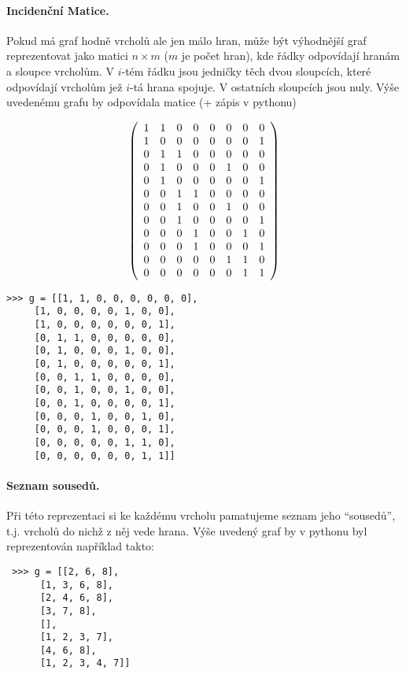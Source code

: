 \paragraph{Incidenční Matice.} Pokud má graf hodně vrcholů ale jen málo hran, může být výhodnější graf reprezentovat jako matici $n\times m$ ($m$ je počet hran), kde řádky
odpovídají hranám a sloupce vrcholům. V $i$-tém řádku jsou jedničky těch dvou sloupcích, které odpovídají vrcholům jež $i$-tá hrana spojuje. V ostatních sloupcích jsou nuly.
Výše uvedenému grafu by odpovídala matice (+ zápis v pythonu)
\begin{center}
\begin{minipage}{3.5cm}
$$
\left(
\begin{array}{cccccccc}
1 & 1 & 0 & 0 & 0 & 0 & 0 & 0\cr
1 & 0 & 0 & 0 & 0 & 0 & 0 & 1\cr
0 & 1 & 1 & 0 & 0 & 0 & 0 & 0\cr
0 & 1 & 0 & 0 & 0 & 1 & 0 & 0\cr
0 & 1 & 0 & 0 & 0 & 0 & 0 & 1\cr
0 & 0 & 1 & 1 & 0 & 0 & 0 & 0\cr
0 & 0 & 1 & 0 & 0 & 1 & 0 & 0\cr
0 & 0 & 1 & 0 & 0 & 0 & 0 & 1\cr
0 & 0 & 0 & 1 & 0 & 0 & 1 & 0\cr
0 & 0 & 0 & 1 & 0 & 0 & 0 & 1\cr
0 & 0 & 0 & 0 & 0 & 1 & 1 & 0\cr
0 & 0 & 0 & 0 & 0 & 0 & 1 & 1\cr
\end{array}
\right)
$$
\end{minipage}
\hskip2cm
\begin{minipage}{6cm}
\begin{verbatim}
>>> g = [[1, 1, 0, 0, 0, 0, 0, 0],
	 [1, 0, 0, 0, 0, 1, 0, 0],
	 [1, 0, 0, 0, 0, 0, 0, 1],
	 [0, 1, 1, 0, 0, 0, 0, 0],
	 [0, 1, 0, 0, 0, 1, 0, 0],
	 [0, 1, 0, 0, 0, 0, 0, 1],
	 [0, 0, 1, 1, 0, 0, 0, 0],
	 [0, 0, 1, 0, 0, 1, 0, 0],
	 [0, 0, 1, 0, 0, 0, 0, 1],
	 [0, 0, 0, 1, 0, 0, 1, 0],
	 [0, 0, 0, 1, 0, 0, 0, 1],
	 [0, 0, 0, 0, 0, 1, 1, 0],
	 [0, 0, 0, 0, 0, 0, 1, 1]]
\end{verbatim}
\end{minipage}
\end{center}

\paragraph{Seznam sousedů.} Při této reprezentaci si ke každému vrcholu pamatujeme seznam jeho ``sousedů'', t.j. vrcholů do nichž z něj vede hrana.
Výše uvedený graf by v pythonu byl reprezentován například takto:

\begin{verbatim}
 >>> g = [[2, 6, 8],
	  [1, 3, 6, 8],
	  [2, 4, 6, 8],
	  [3, 7, 8],
	  [],
	  [1, 2, 3, 7],
	  [4, 6, 8],
	  [1, 2, 3, 4, 7]]
\end{verbatim}

